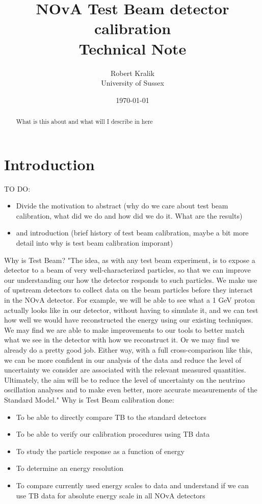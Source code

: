 \documentclass[12pt,a4paper]{article}
\author{Robert Kralik\\\small{University of Sussex}}
\title{NOvA Test Beam detector calibration\\ \vspace*{5mm}
\Large{Technical Note}}
\date{\today}
\begin{document}
\maketitle
\begin{abstract}
What is this about and what will I describe in here
\end{abstract}
\tableofcontents
\newpage

\section{Introduction}
TO DO:
\begin{itemize}
\item Divide the motivation to abstract (why do we care about test beam calibration, what did we do and how did we do it. What are the results)
\item and introduction (brief history of test beam calibration, maybe a bit more detail into why is test beam calibration imporant)
\end{itemize}

Why is Test Beam?
"The idea, as with any test beam experiment, is to expose a detector to a beam of very well-characterized particles, so that we can improve our understanding our how the detector responds to such particles. We make use of upstream detectors to collect data on the beam particles before they interact in the NOvA detector. For example, we will be able to see what a 1 GeV proton actually looks like in our detector, without having to simulate it, and we can test how well we would have reconstructed the energy using our existing techniques. We may find we are able to make improvements to our tools to better match what we see in the detector with how we reconstruct it. Or we may find we already do a pretty good job. Either way, with a full cross-comparison like this, we can be more confident in our analysis of the data and reduce the level of uncertainty we consider are associated with the relevant measured quantities. Ultimately, the aim will be to reduce the level of uncertainty on the neutrino oscillation analyses and to make even better, more accurate measurements of the Standard Model."%
Why is Test Beam calibration done:
\begin{itemize}
\item To be able to directly compare TB to the standard detectors
\item To be able to verify our calibration procedures using TB data
\item To study the particle response as a function of energy 
\item To determine an energy resolution
\item To compare currently used energy scales to data and understand if we can use TB data for absolute energy scale in all NOvA detectors
\end{itemize}
\end{document}
